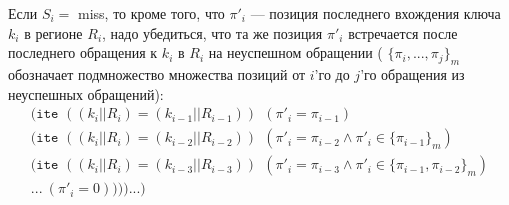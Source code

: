 \begin{enumerate}
Если $S_i = $ miss, то кроме того, что $\pi'_i$ --- позиция последнего вхождения ключа $k_i$ в регионе $R_i$, надо убедиться, что та же позиция $\pi'_i$ встречается после последнего обращения к $k_i$ в $R_i$ на неуспешном обращении ( $\{\pi_i, ..., \pi_j\}_m$ обозначает подмножество множества позиций от $i$'го до $j$'го обращения из неуспешных обращений):
$$
\begin{array}{l}
\texttt{(ite~} ((k_i||R_i) = (k_{i-1}||R_{i-1})) ~~ (\pi'_i = \pi_{i-1})\\
\texttt{(ite~} ((k_i||R_i) = (k_{i-2}||R_{i-2})) ~~ (\pi'_i = \pi_{i-2} \wedge \pi'_i \in \{\pi_{i-1}\}_m)\\
\texttt{(ite~} ((k_i||R_i) = (k_{i-3}||R_{i-3})) ~~ (\pi'_i = \pi_{i-3} \wedge \pi'_i \in \{\pi_{i-1}, \pi_{i-2}\}_m)\\
... ~(\pi'_i = 0)\texttt{)))...)}\\
\end{array}
$$


\end{enumerate}
